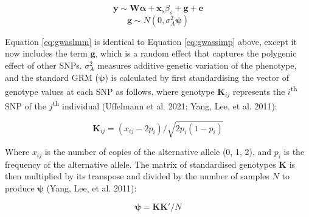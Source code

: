 \documentclass[
]{book}
\begin{document}
\begin{equation}
\pmb{y} \sim \pmb{W} \pmb{\alpha} + \pmb{x}_s\beta_s + \pmb{g} + \pmb{e} \label{eq:gwaslmm}
\end{equation}
\begin{equation}
\pmb{g} \sim N(0,\sigma^2_A\pmb{\psi}) \label{eq:gwaslmmg}
\end{equation}

Equation \eqref{eq:gwaslmm} is identical to Equation \eqref{eq:gwassimp} above, except it now includes the term \(\pmb{g}\), which is a random effect that captures the polygenic effect of other SNPs. \(\sigma^2_{A}\) measures additive genetic variation of the phenotype, and the standard GRM (\(\pmb{\psi}\)) is calculated by first standardising the vector of genotype values at each SNP as follows, where genotype \(\pmb{K}_{ij}\) represents the \(i\)\textsuperscript{th} SNP of the \(j\)\textsuperscript{th} individual (Uffelmann et al. 2021; Yang, Lee, et al. 2011):

\begin{equation}
\pmb{K}_{ij} = (x_{ij} - 2p_i)/\sqrt{2p_i(1-p_i)} \label{eq:grmstd}
\end{equation}

Where \(x_{ij}\) is the number of copies of the alternative allele (0, 1, 2), and \(p_i\) is the frequency of the alternative allele. The matrix of standardised genotypes \(\pmb{K}\) is then multiplied by its transpose and divided by the number of samples \(N\) to produce \(\pmb{\psi}\) (Yang, Lee, et al. 2011):

\begin{equation}
\pmb{\psi} = \pmb{K}\pmb{K}'/ N \label{eq:grm}
\end{equation}
\end{document}
